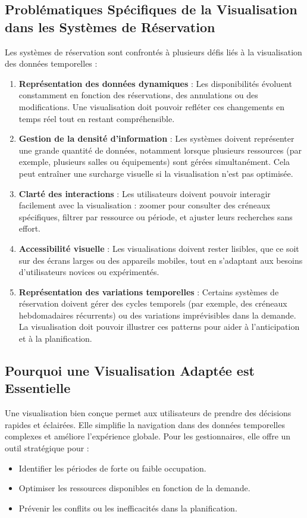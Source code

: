 \documentclass[runningheads]{llncs}
\begin{document}
\subsection{Problématiques Spécifiques de la Visualisation dans les Systèmes de Réservation}
Les systèmes de réservation sont confrontés à plusieurs défis liés à la visualisation des données temporelles :

\begin{enumerate}
    \item \textbf{Représentation des données dynamiques} : Les disponibilités évoluent constamment en fonction des réservations, des annulations ou des modifications. Une visualisation doit pouvoir refléter ces changements en temps réel tout en restant compréhensible.
    \item \textbf{Gestion de la densité d’information} : Les systèmes doivent représenter une grande quantité de données, notamment lorsque plusieurs ressources (par exemple, plusieurs salles ou équipements) sont gérées simultanément. Cela peut entraîner une surcharge visuelle si la visualisation n’est pas optimisée.
    \item \textbf{Clarté des interactions} : Les utilisateurs doivent pouvoir interagir facilement avec la visualisation : zoomer pour consulter des créneaux spécifiques, filtrer par ressource ou période, et ajuster leurs recherches sans effort.
    \item \textbf{Accessibilité visuelle} : Les visualisations doivent rester lisibles, que ce soit sur des écrans larges ou des appareils mobiles, tout en s’adaptant aux besoins d’utilisateurs novices ou expérimentés.
    \item \textbf{Représentation des variations temporelles} : Certains systèmes de réservation doivent gérer des cycles temporels (par exemple, des créneaux hebdomadaires récurrents) ou des variations imprévisibles dans la demande. La visualisation doit pouvoir illustrer ces patterns pour aider à l’anticipation et à la planification.
\end{enumerate}

\subsection{Pourquoi une Visualisation Adaptée est Essentielle}
Une visualisation bien conçue permet aux utilisateurs de prendre des décisions rapides et éclairées. Elle simplifie la navigation dans des données temporelles complexes et améliore l'expérience globale. Pour les gestionnaires, elle offre un outil stratégique pour :
\begin{itemize}
    \item Identifier les périodes de forte ou faible occupation.
    \item Optimiser les ressources disponibles en fonction de la demande.
    \item Prévenir les conflits ou les inefficacités dans la planification.
\end{itemize}
\end{document}
